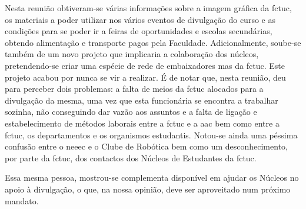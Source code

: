 Nesta reunião obtiveram-se várias informações sobre a imagem gráfica da \acrshort{fctuc}, os materiais a poder utilizar nos vários eventos de divulgação do curso e as condições para se poder ir a feiras de oportunidades e escolas secundárias, obtendo alimentação e transporte pagos pela Faculdade. Adicionalmente, soube-se também de um novo projeto que implicaria a colaboração dos núcleos, pretendendo-se criar uma espécie de rede de embaixadores mas da \acrshort{fctuc}. Este projeto acabou por nunca se vir a realizar. É de notar que, nesta reunião, deu para perceber dois problemas: a falta de meios da \acrshort{fctuc} alocados para a divulgação da mesma, uma vez que esta funcionária se encontra a trabalhar sozinha, não conseguindo dar vazão aos assuntos e a falta de ligação e estabelecimento de métodos laborais entre a \acrshort{fctuc} e a \acrshort{aac} bem como entre a \acrshort{fctuc}, os departamentos e os organismos estudantis. Notou-se ainda uma péssima confusão entre o \acrshort{neeec} e o Clube de Robótica bem como um desconhecimento, por parte da \acrshort{fctuc}, dos contactos dos Núcleos de Estudantes da \acrshort{fctuc}.

Essa mesma pessoa, mostrou-se complementa disponível em ajudar os Núcleos no apoio à divulgação, o que, na nossa opinião, deve ser aproveitado num próximo mandato.